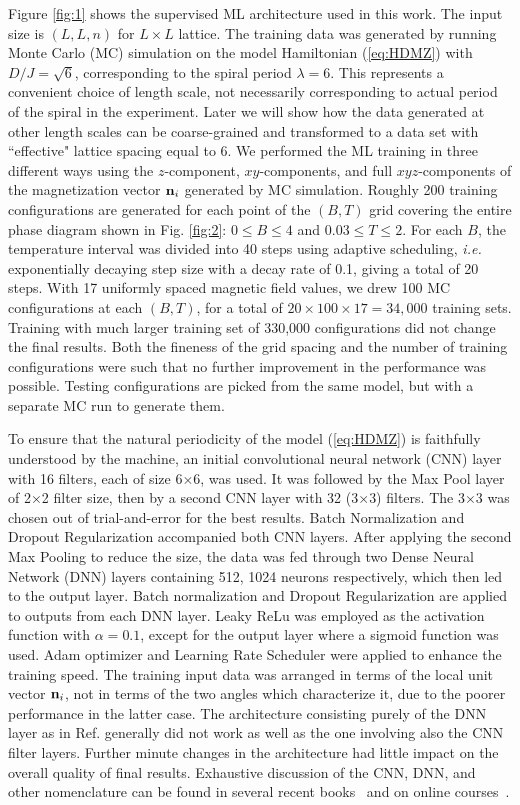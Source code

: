 \documentclass[reprint,amsmath,amssymb,aps,showpacs,superscriptaddress,prb]{revtex4-1}
\renewcommand{\v}[1]{{\bf #1}}
\begin{document}
Figure \ref{fig:1} shows the supervised ML architecture used in this work. The input size is $(L,L,n)$ for $L\times L$ lattice.  The training data was generated by running Monte Carlo (MC) simulation on the model Hamiltonian (\ref{eq:HDMZ}) with $D/J=\sqrt{6}$, corresponding to the spiral period $\lambda=6$. This represents a convenient choice of length scale, not necessarily corresponding to actual period of the spiral in the experiment. Later we will show how the data generated at other length scales can be coarse-grained and transformed to a data set with  ``effective" lattice spacing equal to 6. We performed the ML training in three different ways using the $z$-component, $xy$-components, and full $xyz$-components of the magnetization vector $\v n_i$ generated by MC simulation. Roughly 200 training configurations are generated for each point of the $(B, T)$ grid covering the entire phase diagram shown in Fig. \ref{fig:2}: $0 \le B \le 4$ and $0.03 \le T \le 2$. For each $B$, the temperature interval was divided into 40 steps using adaptive scheduling, {\it i.e.} exponentially decaying step size with a decay rate of 0.1, giving a total of 20 steps. With 17 uniformly spaced magnetic field values, we drew 100 MC configurations at each $(B,T)$, for a total of $20 \times 100\times 17 = 34,000$ training sets. Training with much larger training set of 330,000 configurations did not change the final results. Both the fineness of the grid spacing and the number of training configurations were such that no further improvement in the performance was possible.
Testing configurations are picked from the same model, but with a separate MC run to generate them.

To ensure that the natural periodicity of the model (\ref{eq:HDMZ}) is faithfully understood by the machine, an initial convolutional neural network (CNN) layer with 16 filters, each of size 6$\times$6, was used. It was followed by the Max Pool layer of 2$\times$2 filter size, then by a second CNN layer with 32 (3$\times$3) filters.  The 3$\times$3 was chosen out of trial-and-error for the best results. Batch Normalization and Dropout Regularization accompanied both CNN layers. After applying the second Max Pooling to reduce the size, the data was fed through two Dense Neural Network (DNN) layers containing 512, 1024 neurons respectively, which then led to the output layer. Batch normalization and Dropout Regularization are applied to outputs from each DNN layer. Leaky ReLu was employed as the activation function with $\alpha=0.1$, except for the output layer where a sigmoid function was used. Adam optimizer and Learning Rate Scheduler were applied to enhance the training speed.  The training input data was arranged in terms of the local unit vector $\v n_i$, not in terms of the two angles which characterize it, due to the poorer performance in the latter case. The architecture consisting purely of the DNN layer as in Ref. \cite{russian18} generally did not work as well as the one involving also the CNN filter layers. Further minute changes in the architecture had little impact on the overall quality of final results. Exhaustive discussion of the CNN, DNN, and other nomenclature can be found in several recent books~\cite{bishop,goodfellow} and on online courses~\cite{ng}.
\end{document}
